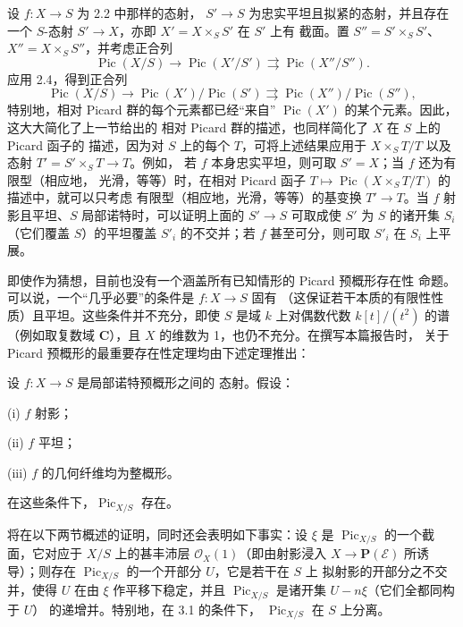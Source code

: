  设 $f:X\longrightarrow S$ 为 2.2 中那样的态射，
$S'\longrightarrow S$ 为忠实平坦且拟紧的态射，并且存在一个
$S$-态射 $S'\longrightarrow X$，亦即 $X'=X\times_SS'$ 在 $S'$ 上有
截面。置 $S''=S'\times_SS'$、$X''=X\times_SS''$，并考虑正合列
\[
\operatorname{Pic}(X/S)\longrightarrow\operatorname{Pic}(X'/S')
\rightrightarrows\operatorname{Pic}(X''/S'').
\]
应用 2.4，得到正合列
\[
\operatorname{Pic}(X/S)\longrightarrow
\operatorname{Pic}(X')/\operatorname{Pic}(S')
\rightrightarrows
\operatorname{Pic}(X'')/\operatorname{Pic}(S''),
\]
特别地，相对 Picard 群的每个元素都已经“来自”
$\operatorname{Pic}(X')$ 的某个元素。因此，这大大简化了上一节给出的
相对 Picard 群的描述，也同样简化了 $X$ 在 $S$ 上的 Picard 函子的
描述，因为对 $S$ 上的每个 $T$，可将上述结果应用于
$X\times_ST/T$ 以及态射 $T'=S'\times_ST\longrightarrow T$。例如，
若 $f$ 本身忠实平坦，则可取 $S'=X$；当 $f$ 还为有限型（相应地，
光滑，等等）时，在相对 Picard 函子
$T\longmapsto\operatorname{Pic}(X\times_ST/T)$ 的描述中，就可以只考虑
有限型（相应地，光滑，等等）的基变换 $T'\longrightarrow T$。当 $f$
射影且平坦、$S$ 局部诺特时，可以证明上面的
$S'\longrightarrow S$ 可取成使 $S'$ 为 $S$ 的诸开集 $S_i$（它们覆盖
$S$）的平坦覆盖 $S'_i$ 的不交并；若 $f$ 甚至可分，则可取 $S'_i$ 在
$S_i$ 上平展。


即使作为猜想，目前也没有一个涵盖所有已知情形的 Picard 预概形存在性
命题。可以说，一个“几乎必要”的条件是 $f:X\longrightarrow S$ 固有
（这保证若干本质的有限性性质）且平坦。这些条件并不充分，即使 $S$
是域 $k$ 上对偶数代数 $k[t]/(t^2)$ 的谱（例如取复数域
$\mathbf C$），且 $X$ 的维数为 1，也仍不充分。在撰写本篇报告时，
关于 Picard 预概形的最重要存在性定理均由下述定理推出：

 设 $f:X\longrightarrow S$ 是局部诺特预概形之间的
态射。假设：

\noindent (i) $f$ 射影；

\noindent (ii) $f$ 平坦；

\noindent (iii) $f$ 的几何纤维均为整概形。

在这些条件下，$\operatorname{Pic}_{X/S}$ 存在。

将在以下两节概述的证明，同时还会表明如下事实：设 $\xi$ 是
$\operatorname{Pic}_{X/S}$ 的一个截面，它对应于 $X/S$ 上的甚丰沛层
$\mathcal O_X(1)$（即由射影浸入
$X\longrightarrow\mathbf P(\mathcal E)$ 所诱导）；则存在
$\operatorname{Pic}_{X/S}$ 的一个开部分 $U$，它是若干在 $S$ 上
拟射影的开部分之不交并，使得 $U$ 在由 $\xi$ 作平移下稳定，并且
$\operatorname{Pic}_{X/S}$ 是诸开集 $U-n\xi$（它们全都同构于 $U$）
的递增并。特别地，在 3.1 的条件下，
$\operatorname{Pic}_{X/S}$ 在 $S$ 上分离。

